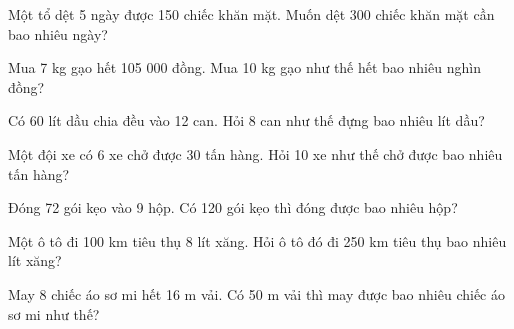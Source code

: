 \begin{ex}
Một tổ dệt 5 ngày được 150 chiếc khăn mặt. Muốn dệt 300 chiếc khăn mặt cần bao nhiêu ngày?
\end{ex}

\begin{ex}
Mua 7 kg gạo hết 105 000 đồng. Mua 10 kg gạo như thế hết bao nhiêu nghìn đồng?
\end{ex}

\begin{ex}
Có 60 lít dầu chia đều vào 12 can. Hỏi 8 can như thế đựng bao nhiêu lít dầu?
\end{ex}

\begin{ex}
Một đội xe có 6 xe chở được 30 tấn hàng. Hỏi 10 xe như thế chở được bao nhiêu tấn hàng?
\end{ex}

\begin{ex}
Đóng 72 gói kẹo vào 9 hộp. Có 120 gói kẹo thì đóng được bao nhiêu hộp?
\end{ex}

\begin{ex}
Một ô tô đi 100 km tiêu thụ 8 lít xăng. Hỏi ô tô đó đi 250 km tiêu thụ bao nhiêu lít xăng?
\end{ex}

\begin{ex}
May 8 chiếc áo sơ mi hết 16 m vải. Có 50 m vải thì may được bao nhiêu chiếc áo sơ mi như thế?
\end{ex}
